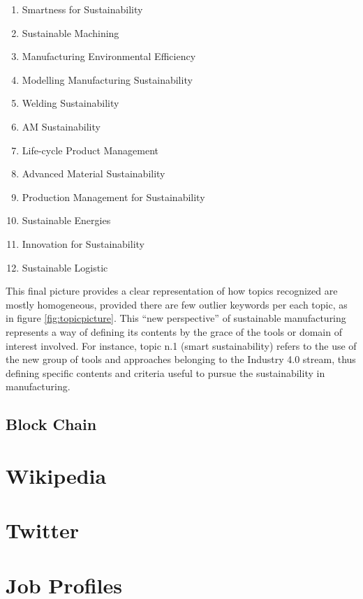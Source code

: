 \documentclass[]{book}
\providecommand{\tightlist}{%
  \setlength{\itemsep}{0pt}\setlength{\parskip}{0pt}}
\begin{document}
\begin{enumerate}
\def\labelenumi{\arabic{enumi}.}
\tightlist
\item
  Smartness for Sustainability
\item
  Sustainable Machining
\item
  Manufacturing Environmental Efficiency
\item
  Modelling Manufacturing Sustainability
\item
  Welding Sustainability
\item
  AM Sustainability
\item
  Life-cycle Product Management
\item
  Advanced Material Sustainability
\item
  Production Management for Sustainability
\item
  Sustainable Energies
\item
  Innovation for Sustainability
\item
  Sustainable Logistic
\end{enumerate}

This final picture provides a clear representation of how topics
recognized are mostly homogeneous, provided there are few outlier
keywords per each topic, as in figure \ref{fig:topicpicture}. This ``new
perspective'' of sustainable manufacturing represents a way of defining
its contents by the grace of the tools or domain of interest involved.
For instance, topic n.1 (smart sustainability) refers to the use of the
new group of tools and approaches belonging to the Industry 4.0 stream,
thus defining specific contents and criteria useful to pursue the
sustainability in manufacturing.

\subsection{Block Chain}\label{block-chain}

\section{Wikipedia}\label{wikipedia}

\section{Twitter}\label{twitter}

\section{Job Profiles}\label{job-profiles}
\end{document}
